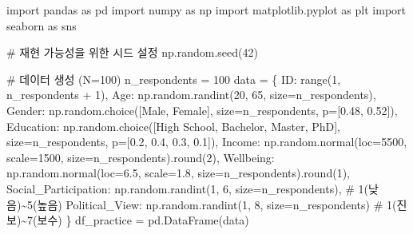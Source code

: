 \documentclass[
  letterpaper,
]{book}
\newenvironment{Shaded}{\begin{snugshade}}{\end{snugshade}}
\newcommand{\BuiltInTok}[1]{\textcolor[rgb]{0.00,0.23,0.31}{#1}}
\newcommand{\CommentTok}[1]{\textcolor[rgb]{0.37,0.37,0.37}{#1}}
\newcommand{\DecValTok}[1]{\textcolor[rgb]{0.68,0.00,0.00}{#1}}
\newcommand{\FloatTok}[1]{\textcolor[rgb]{0.68,0.00,0.00}{#1}}
\newcommand{\ImportTok}[1]{\textcolor[rgb]{0.00,0.46,0.62}{#1}}
\newcommand{\NormalTok}[1]{\textcolor[rgb]{0.00,0.23,0.31}{#1}}
\newcommand{\OperatorTok}[1]{\textcolor[rgb]{0.37,0.37,0.37}{#1}}
\newcommand{\StringTok}[1]{\textcolor[rgb]{0.13,0.47,0.30}{#1}}
\begin{document}
\begin{Shaded}
\begin{Highlighting}[]
\ImportTok{import}\NormalTok{ pandas }\ImportTok{as}\NormalTok{ pd}
\ImportTok{import}\NormalTok{ numpy }\ImportTok{as}\NormalTok{ np}
\ImportTok{import}\NormalTok{ matplotlib.pyplot }\ImportTok{as}\NormalTok{ plt}
\ImportTok{import}\NormalTok{ seaborn }\ImportTok{as}\NormalTok{ sns}

\CommentTok{\# 재현 가능성을 위한 시드 설정}
\NormalTok{np.random.seed(}\DecValTok{42}\NormalTok{)}

\CommentTok{\# 데이터 생성 (N=100)}
\NormalTok{n\_respondents }\OperatorTok{=} \DecValTok{100}
\NormalTok{data }\OperatorTok{=}\NormalTok{ \{}
    \StringTok{\textquotesingle{}ID\textquotesingle{}}\NormalTok{: }\BuiltInTok{range}\NormalTok{(}\DecValTok{1}\NormalTok{, n\_respondents }\OperatorTok{+} \DecValTok{1}\NormalTok{),}
    \StringTok{\textquotesingle{}Age\textquotesingle{}}\NormalTok{: np.random.randint(}\DecValTok{20}\NormalTok{, }\DecValTok{65}\NormalTok{, size}\OperatorTok{=}\NormalTok{n\_respondents),}
    \StringTok{\textquotesingle{}Gender\textquotesingle{}}\NormalTok{: np.random.choice([}\StringTok{\textquotesingle{}Male\textquotesingle{}}\NormalTok{, }\StringTok{\textquotesingle{}Female\textquotesingle{}}\NormalTok{], size}\OperatorTok{=}\NormalTok{n\_respondents, p}\OperatorTok{=}\NormalTok{[}\FloatTok{0.48}\NormalTok{, }\FloatTok{0.52}\NormalTok{]),}
    \StringTok{\textquotesingle{}Education\textquotesingle{}}\NormalTok{: np.random.choice([}\StringTok{\textquotesingle{}High School\textquotesingle{}}\NormalTok{, }\StringTok{\textquotesingle{}Bachelor\textquotesingle{}}\NormalTok{, }\StringTok{\textquotesingle{}Master\textquotesingle{}}\NormalTok{, }\StringTok{\textquotesingle{}PhD\textquotesingle{}}\NormalTok{], size}\OperatorTok{=}\NormalTok{n\_respondents, p}\OperatorTok{=}\NormalTok{[}\FloatTok{0.2}\NormalTok{, }\FloatTok{0.4}\NormalTok{, }\FloatTok{0.3}\NormalTok{, }\FloatTok{0.1}\NormalTok{]),}
    \StringTok{\textquotesingle{}Income\textquotesingle{}}\NormalTok{: np.random.normal(loc}\OperatorTok{=}\DecValTok{5500}\NormalTok{, scale}\OperatorTok{=}\DecValTok{1500}\NormalTok{, size}\OperatorTok{=}\NormalTok{n\_respondents).}\BuiltInTok{round}\NormalTok{(}\DecValTok{2}\NormalTok{),}
    \StringTok{\textquotesingle{}Wellbeing\textquotesingle{}}\NormalTok{: np.random.normal(loc}\OperatorTok{=}\FloatTok{6.5}\NormalTok{, scale}\OperatorTok{=}\FloatTok{1.8}\NormalTok{, size}\OperatorTok{=}\NormalTok{n\_respondents).}\BuiltInTok{round}\NormalTok{(}\DecValTok{1}\NormalTok{),}
    \StringTok{\textquotesingle{}Social\_Participation\textquotesingle{}}\NormalTok{: np.random.randint(}\DecValTok{1}\NormalTok{, }\DecValTok{6}\NormalTok{, size}\OperatorTok{=}\NormalTok{n\_respondents), }\CommentTok{\# 1(낮음)\textasciitilde{}5(높음)}
    \StringTok{\textquotesingle{}Political\_View\textquotesingle{}}\NormalTok{: np.random.randint(}\DecValTok{1}\NormalTok{, }\DecValTok{8}\NormalTok{, size}\OperatorTok{=}\NormalTok{n\_respondents) }\CommentTok{\# 1(진보)\textasciitilde{}7(보수)}
\NormalTok{\}}
\NormalTok{df\_practice }\OperatorTok{=}\NormalTok{ pd.DataFrame(data)}


\end{Highlighting}
\end{Shaded}
\end{document}
